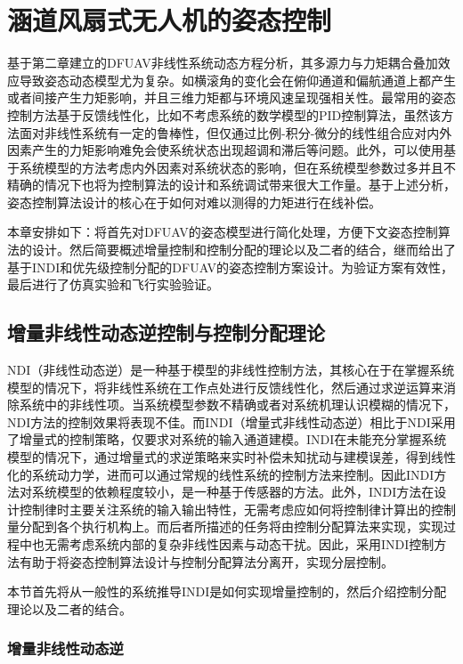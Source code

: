 \chapter{涵道风扇式无人机的姿态控制}

基于第二章建立的DFUAV非线性系统动态方程分析，其多源力与力矩耦合叠加效应导致姿态动态模型尤为复杂。如横滚角的变化会在俯仰通道和偏航通道上都产生或者间接产生力矩影响，并且三维力矩都与环境风速呈现强相关性。最常用的姿态控制方法基于反馈线性化，比如不考虑系统的数学模型的PID控制算法，虽然该方法面对非线性系统有一定的鲁棒性，但仅通过比例-积分-微分的线性组合应对内外因素产生的力矩影响难免会使系统状态出现超调和滞后等问题。此外，可以使用基于系统模型的方法考虑内外因素对系统状态的影响，但在系统模型参数过多并且不精确的情况下也将为控制算法的设计和系统调试带来很大工作量。基于上述分析，姿态控制算法设计的核心在于如何对难以测得的力矩进行在线补偿。

本章安排如下：将首先对DFUAV的姿态模型进行简化处理，方便下文姿态控制算法的设计。然后简要概述增量控制和控制分配的理论以及二者的结合，继而给出了基于INDI和优先级控制分配的DFUAV的姿态控制方案设计。为验证方案有效性，最后进行了仿真实验和飞行实验验证。

\section{增量非线性动态逆控制与控制分配理论}

NDI（非线性动态逆）是一种基于模型的非线性控制方法，其核心在于在掌握系统模型的情况下，将非线性系统在工作点处进行反馈线性化，然后通过求逆运算来消除系统中的非线性项。当系统模型参数不精确或者对系统机理认识模糊的情况下，NDI方法的控制效果将表现不佳。而INDI（增量式非线性动态逆）相比于NDI采用了增量式的控制策略，仅要求对系统的输入通道建模。INDI在未能充分掌握系统模型的情况下，通过增量式的求逆策略来实时补偿未知扰动与建模误差，得到线性化的系统动力学，进而可以通过常规的线性系统的控制方法来控制\cite{wangStabilityAnalysisIncremental2019b}。因此INDI方法对系统模型的依赖程度较小，是一种基于传感器的方法。此外，INDI方法在设计控制律时主要关注系统的输入输出特性，无需考虑应如何将控制律计算出的控制量分配到各个执行机构上。而后者所描述的任务将由控制分配算法来实现，实现过程中也无需考虑系统内部的复杂非线性因素与动态干扰。因此，采用INDI控制方法有助于将姿态控制算法设计与控制分配算法分离开，实现分层控制。

本节首先将从一般性的系统推导INDI是如何实现增量控制的，然后介绍控制分配理论以及二者的结合。

\subsection{增量非线性动态逆}

